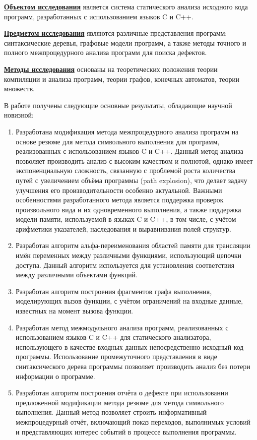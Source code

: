 {\underline{\textbf{Объектом исследования}} является система статического анализа исходного кода программ, разработанных с использованием языков C и C++.

\underline{\textbf{Предметом исследования}} являются различные представления программ: синтаксические деревья, графовые модели программ, а также методы точного и полного межпроцедурного анализа программ для поиска дефектов.

\underline{\textbf{Методы исследования}} основаны на теоретических положения теории компиляции и анализа программ, теории графов, конечных автоматов, теории множеств.

\novelty

В работе получены следующие основные результаты, обладающие научной новизной:
\begin{enumerate}
  \item Разработана модификация метода межпроцедурного анализа программ на основе резюме для метода символьного выполнения для программ, реализованных с использованием языков C и C++. Данный метод анализа позволяет производить анализ с высоким качеством и полнотой, однако имеет экспоненциальную сложность, связанную с проблемой роста количества путей с увеличением объёма программы (path explosion), что делает задачу улучшения его производительности особенно актуальной. Важными особенностями разработанного метода является поддержка проверок произвольного вида и их одновременного выполнения, а также поддержка модели памяти, используемой в языках C и C++, в том числе, с учётом арифметики указателей, наследования и выравнивания полей структур.
  \item Разработан алгоритм альфа-переименования областей памяти для трансляции имён переменных между различными функциями, использующий цепочки доступа. Данный алгоритм используется для установления соответствия между различными объектами функций.
  \item Разработан алгоритм построения фрагментов графа выполнения, моделирующих вызов функции, с учётом ограничений на входные данные, известных на момент вызова функции.
  \item Разработан метод межмодульного анализа программ, реализованных с использованием языков C и C++ для статического анализатора, использующего в качестве входных данных непосредственно исходный код программы. Использование промежуточного представления в виде синтаксического дерева программы позволяет производить анализ без потери информации о программе.
  \item Разработан алгоритм построения отчёта о дефекте при использовании предложенной модификации метода резюме для метода символьного выполнения. Данный метод позволяет строить информативный межпроцедурный отчёт, включающий показ переходов, выполнимых условий и представляющих интерес событий в процессе выполнения программы.
\end{enumerate}

}
